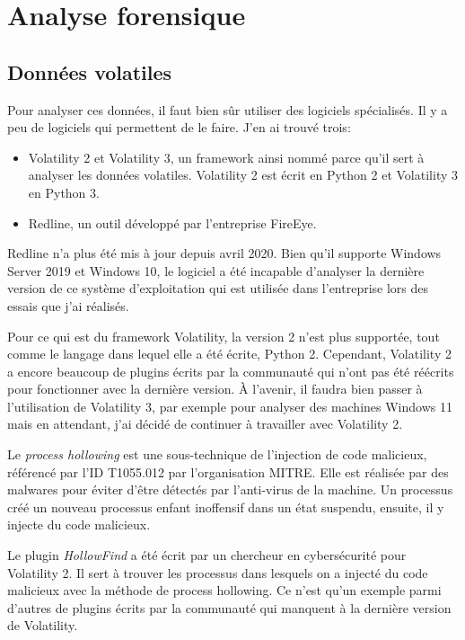 \section{Analyse forensique}





\subsection{Données volatiles}

Pour analyser ces données, il faut bien sûr utiliser des logiciels spécialisés. Il y a peu de logiciels qui permettent de le faire. J'en ai trouvé trois:

\begin{itemize}
    \item Volatility 2 et Volatility 3, un framework ainsi nommé parce qu'il sert à analyser les données volatiles. Volatility 2 est écrit en Python 2 et Volatility 3 en Python 3.
    \item Redline, un outil développé par l'entreprise FireEye.
\end{itemize}

Redline n'a plus été mis à jour depuis avril 2020. Bien qu'il supporte Windows Server 2019 et Windows 10, le logiciel a été incapable d'analyser la dernière version de ce système d'exploitation qui est utilisée dans l'entreprise lors des essais que j'ai réalisés.

Pour ce qui est du framework Volatility, la version 2 n'est plus supportée, tout comme le langage dans lequel elle a été écrite, Python 2. Cependant, Volatility 2 a encore beaucoup de plugins écrits par la communauté qui n'ont pas été réécrits pour fonctionner avec la dernière version. À l'avenir, il faudra bien passer à l'utilisation de Volatility 3, par exemple pour analyser des machines Windows 11 mais en attendant, j'ai décidé de continuer à travailler avec Volatility 2.

\begin{example}
    \hspace{0.45cm} Le \textit{process hollowing} est une sous-technique de l'injection de code malicieux, référencé par l'ID T1055.012 par l'organisation MITRE. Elle est réalisée par des malwares pour éviter d'être détectés par l'anti-virus de la machine. Un processus créé un nouveau processus enfant inoffensif dans un état suspendu, ensuite, il y injecte du code malicieux. \cite{10}

    Le plugin \textit{HollowFind} a été écrit par un chercheur en cybersécurité pour Volatility 2. Il sert à trouver les processus dans lesquels on a injecté du code malicieux avec la méthode de process hollowing. Ce n'est qu'un exemple parmi d'autres de plugins écrits par la communauté qui manquent à la dernière version de Volatility.
\end{example}





